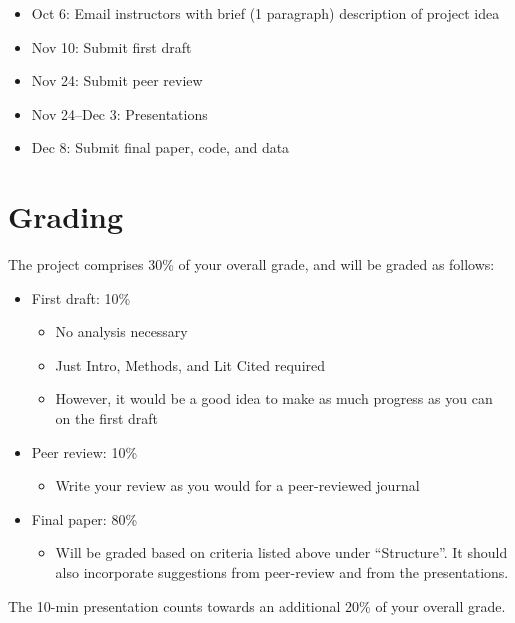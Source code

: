 \documentclass[12pt]{article}
\begin{document}
\begin{itemize}
  \item Oct 6: Email instructors with brief (1 paragraph) description
    of project idea
  \item Nov 10: Submit first draft
  \item Nov 24: Submit peer review
  \item Nov 24--Dec 3: Presentations
  \item Dec 8: Submit final paper, code, and data
\end{itemize}


\section*{Grading}

The project comprises 30\% of your overall grade, and will be graded as follows:

\begin{itemize}
  \item First draft: 10\%
    \begin{itemize}
      \item No analysis necessary
      \item Just Intro, Methods, and Lit Cited required
      \item However, it would be a good idea to make as much progress
        as you can on the first draft
    \end{itemize}
  \item Peer review: 10\%
    \begin{itemize}
      \item Write your review as you would for a peer-reviewed journal
    \end{itemize}
  \item Final paper: 80\%
    \begin{itemize}
      \item Will be graded based on criteria listed above under
        ``Structure''. It should also incorporate suggestions from
        peer-review and from the presentations.
    \end{itemize}
\end{itemize}

The 10-min presentation counts towards an additional 20\% of your
overall grade.
\end{document}
